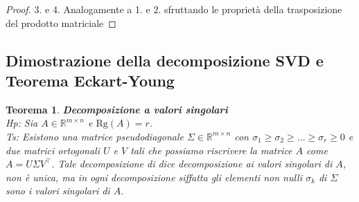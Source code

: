 \documentclass[11pt]{article}
\newtheorem{theorem}{Teorema}
\newcommand{\R}{\mathbb{R}} %
\begin{document}
\begin{proof}{3. e 4.}
Analogamente a 1. e 2. sfruttando le proprietà della trasposizione del prodotto matriciale
\end{proof}

\subsection{Dimostrazione della decomposizione SVD e Teorema Eckart-Young}
\begin{theorem}\label{svd}
\textbf{Decomposizione a valori singolari}\\
\textit{Hp:} Sia $A \in \R^{m \times n}$ e $\text{Rg}(A)=r$. \\
\textit{Ts:} Esistono una matrice pseudodiagonale $\Sigma \in \R^{m \times n}$ con $\sigma_1 \geq \sigma_2 \geq \dots \geq \sigma_r \geq 0$ e due matrici ortogonali $U$ e $V$ tali che possiamo riscrivere la matrice $A$ come $A=U\Sigma V^\top$. Tale decomposizione di dice decomposizione ai valori singolari di $A$, non è unica, ma in ogni decomposizione siffatta gli elementi non nulli $\sigma_k$ di $\Sigma$ sono i valori singolari di $A$. 
\end{theorem}
\end{document}
